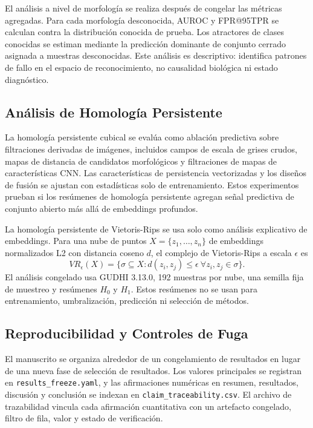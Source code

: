 \documentclass[11pt]{article}
\begin{document}
El análisis a nivel de morfología se realiza después de congelar las métricas agregadas. Para cada morfología desconocida, AUROC y FPR@95TPR se calculan contra la distribución conocida de prueba. Los atractores de clases conocidas se estiman mediante la predicción dominante de conjunto cerrado asignada a muestras desconocidas. Este análisis es descriptivo: identifica patrones de fallo en el espacio de reconocimiento, no causalidad biológica ni estado diagnóstico.

\subsection{Análisis de Homología Persistente}

La homología persistente cubical se evalúa como ablación predictiva sobre filtraciones derivadas de imágenes, incluidos campos de escala de grises crudos, mapas de distancia de candidatos morfológicos y filtraciones de mapas de características CNN. Las características de persistencia vectorizadas y los diseños de fusión se ajustan con estadísticas solo de entrenamiento. Estos experimentos prueban si los resúmenes de homología persistente agregan señal predictiva de conjunto abierto más allá de embeddings profundos.

La homología persistente de Vietoris-Rips se usa solo como análisis explicativo de embeddings. Para una nube de puntos $X=\{z_1,\ldots,z_n\}$ de embeddings normalizados L2 con distancia coseno $d$, el complejo de Vietoris-Rips a escala $\epsilon$ es
\[
VR_\epsilon(X)=\{\sigma\subseteq X: d(z_i,z_j)\leq \epsilon\ \forall z_i,z_j\in\sigma\}.
\]
El análisis congelado usa GUDHI 3.13.0, 192 muestras por nube, una semilla fija de muestreo y resúmenes $H_0$ y $H_1$. Estos resúmenes no se usan para entrenamiento, umbralización, predicción ni selección de métodos.

\subsection{Reproducibilidad y Controles de Fuga}

El manuscrito se organiza alrededor de un congelamiento de resultados en lugar de una nueva fase de selección de resultados. Los valores principales se registran en \texttt{results\_freeze.yaml}, y las afirmaciones numéricas en resumen, resultados, discusión y conclusión se indexan en \texttt{claim\_traceability.csv}. El archivo de trazabilidad vincula cada afirmación cuantitativa con un artefacto congelado, filtro de fila, valor y estado de verificación.
\end{document}
